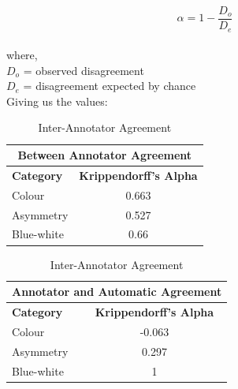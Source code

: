 \begin{equation}
\alpha = 1 - \frac{{D_o}}{{D_e}}
\end{equation}\\
where,\\
\newline
\noindent\( D_o \) = observed disagreement \\
\( D_e \) = disagreement expected by chance\\
\newline
Giving us the values: 
\begin{table}[htbp]
    \centering
    \caption{Inter-Annotator Agreement}
    \begin{tabular}{l c}
        \toprule
        \multicolumn{2}{c}{\textbf{Between Annotator Agreement}} \\
        \midrule
        \textbf{Category} & \textbf{Krippendorff's Alpha} \\
        \midrule
        Colour & 0.663 \\
        Asymmetry & 0.527 \\
        Blue-white & 0.66 \\
        \bottomrule
    \end{tabular}
    \quad
    \begin{tabular}{l c}
        \toprule
        \multicolumn{2}{c}{\textbf{Annotator and Automatic Agreement}} \\
        \midrule
        \textbf{Category} & \textbf{Krippendorff's Alpha} \\
        \midrule
        Colour & -0.063 \\
        Asymmetry & 0.297 \\
        Blue-white & 1 \\
        \bottomrule
    \end{tabular}
\end{table}

